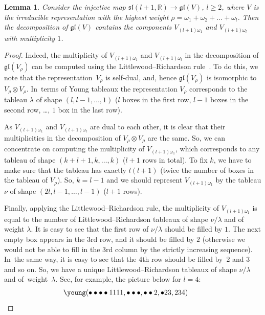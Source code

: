 \documentclass[10pt,a4paper]{amsart}
\newcommand{\R}{\mathbb R}
\newcommand{\gl}{\mathfrak{gl}}
\newtheorem{lem}[thm]{Lemma}
\numberwithin{equation}{section}
\begin{document}
\begin{lem}
	Consider the injective map $\mathfrak{sl}(l+1,\R)\to \gl(V)$, $l\ge2$, where $V$ is the irreducible representation with the highest weight $\rho=\omega_1+\omega_2+\dots+\omega_l$. Then the decomposition of $\gl(V)$ contains the components $V_{(l+1)\omega_1}$ and $V_{(l+1)\omega_l}$ with multiplicity $1$.
\end{lem}
\begin{proof}
	Indeed, the multiplicity of $V_{(l+1)\omega_1}$ and $V_{(l+1)\omega_l}$ in the decomposition of $\gl(V_{\rho})$ can be computed using the Littlewood--Richardson rule~\cite{fulton}. To do this, we note that the representation~$V_\rho$ is self-dual, and, hence $\gl(V_\rho)$ is isomorphic to $V_{\rho}\otimes V_{\rho}$. In~terms of Young tableaux the representation $V_{\rho}$ corresponds to the tableau $\lambda$ of shape $(l,l-1,\dots,1)$ ($l$ boxes in the first row, $l-1$ boxes in the second row, \dots, $1$ box in the last row).
	
	As $V_{(l+1)\omega_1}$ and $V_{(l+1)\omega_l}$ are dual to each other, it is clear that their multiplicities in the decomposition of $V_{\rho}\otimes V_{\rho}$ are the same. So, we can concentrate on computing the multiplicity of $V_{(l+1)\omega_1}$, which corresponds to any tableau of shape $(k+l+1,k,\dots,k)$ ($l+1$ rows in total). To fix $k$, we have to make sure that the tableau has exactly $l(l+1)$ (twice the number of boxes in the tableau of $V_{\rho}$). So, $k=l-1$ and we should represent $V_{(l+1)\omega_1}$ by the tableau $\nu$ of shape $(2l,l-1,\dots,l-1)$ ($l+1$ rows).
	
	Finally, applying the Littlewood--Richardson rule, the multiplicity of $V_{(l+1)\omega_1}$ is equal to the number of Littlewood--Richardson tableaux of shape $\nu/\lambda$ and of weight $\lambda$. It is easy to see that the first row of $\nu/\lambda$ should be filled by $1$. The next empty box appears in the 3rd row, and it should be filled by $2$ (otherwise we would not be able to fill in the 3rd column by the strictly increasing sequence). In~the same way, it is easy to see that the 4th row should be filled by~$2$ and $3$ and so on. So, we have a unique Littlewood--Richardson tableaux of shape $\nu/\lambda$ and of~weight~$\lambda$. See, for example, the picture below for $l=4$:
	\begin{gather*}
	\young(\bullet\bullet\bullet\bullet 1111,\bullet\bullet\bullet,\bullet\bullet 2,\bullet 23,234)\tag*{\qed}
\end{gather*}
\renewcommand{\qed}{}
\end{proof}
\end{document}
